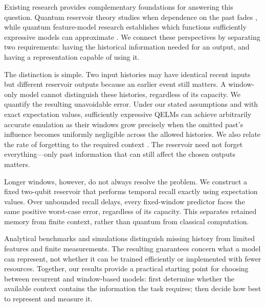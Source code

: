 Existing research provides complementary foundations for answering this
question. Quantum reservoir theory studies when dependence on the past
fades \cite{boyd1985fading,martinezpena2023finite}, while quantum
feature-model research establishes which functions sufficiently expressive
models can approximate \cite{goto2021universal}. We connect these
perspectives by separating two requirements: having the historical
information needed for an output, and having a representation capable of
using it.

The distinction is simple. Two input histories may have identical recent
inputs but different reservoir outputs because an earlier event still
matters. A window-only model cannot distinguish these histories, regardless
of its capacity. We quantify the resulting unavoidable error. Under our
stated assumptions and with exact expectation values, sufficiently
expressive QELMs can achieve arbitrarily accurate emulation as their windows
grow precisely when the omitted past's influence becomes uniformly
negligible across the allowed histories. We also relate the rate of
forgetting to the required context \cite{petreczky2026stability}. The
reservoir need not forget everything---only past information that can still
affect the chosen outputs matters.

Longer windows, however, do not always resolve the problem. We construct a
fixed two-qubit reservoir that performs temporal recall exactly using
expectation values. Over unbounded recall delays, every fixed-window
predictor faces the same positive worst-case error, regardless of its
capacity. This separates retained memory from finite context, rather than
quantum from classical computation.

Analytical benchmarks and simulations distinguish missing history from
limited features and finite measurements. The resulting guarantees concern
what a model can represent, not whether it can be trained efficiently or
implemented with fewer resources. Together, our results provide a practical
starting point for choosing between recurrent and window-based models:
first determine whether the available context contains the information the
task requires; then decide how best to represent and measure it.
